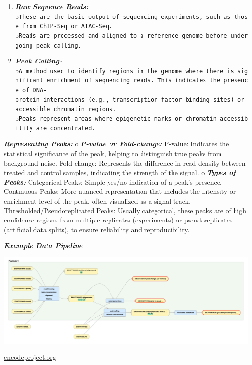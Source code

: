 \documentclass[
]{book}
\providecommand{\tightlist}{%
  \setlength{\itemsep}{0pt}\setlength{\parskip}{0pt}}
\begin{document}
\begin{enumerate}
\def\labelenumi{\arabic{enumi}.}
\tightlist
\item
  \textbf{\emph{Raw Sequence Reads:}}
  o\texttt{These\ are\ the\ basic\ output\ of\ sequencing\ experiments,\ such\ as\ those\ from\ ChIP-Seq\ or\ ATAC-Seq.}
  o\texttt{Reads\ are\ processed\ and\ aligned\ to\ a\ reference\ genome\ before\ undergoing\ peak\ calling.}
\item
  \textbf{\emph{Peak Calling:}}
  o\texttt{A\ method\ used\ to\ identify\ regions\ in\ the\ genome\ where\ there\ is\ significant\ enrichment\ of\ sequencing\ reads.\ This\ indicates\ the\ presence\ of\ DNA-protein\ interactions\ (e.g.,\ transcription\ factor\ binding\ sites)\ or\ accessible\ chromatin\ regions.}
  o\texttt{Peaks\ represent\ areas\ where\ epigenetic\ marks\ or\ chromatin\ accessibility\ are\ concentrated.}
\end{enumerate}

\textbf{\emph{Representing Peaks:}}
o \textbf{\emph{P-value or Fold-change:}}
P-value: Indicates the statistical significance of the peak, helping to distinguish true peaks from background noise.
Fold-change: Represents the difference in read density between treated and control samples, indicating the strength of the signal.
o \textbf{\emph{Types of Peaks:}}
Categorical Peaks: Simple yes/no indication of a peak's presence.
Continuous Peaks: More nuanced representation that includes the intensity or enrichment level of the peak, often visualized as a signal track.
Thresholded/Pseudoreplicated Peaks: Usually categorical, these peaks are of high confidence regions from multiple replicates (experiments) or pseudoreplicates (artificial data splits), to ensure reliability and reproducibility.

\textbf{\emph{Example Data Pipeline}}

\includegraphics{images/chIP-Seq_pipeline.png}

\href{https://www.encodeproject.org/experiments/ENCSR817LUF/}{encodeproject.org}
\end{document}
